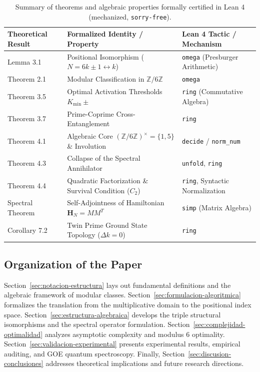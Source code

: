 \documentclass{article}
\numberwithin{equation}{section}
\theoremstyle{plain}
\theoremstyle{definition}
\begin{document}

\begin{table}[htbp]
\centering
\small
\caption{Summary of theorems and algebraic properties formally certified in Lean 4 (mechanized, \texttt{sorry-free}).}
\label{tab:lean4-certifications}
\begin{tabular}{lll}
\toprule
\textbf{Theoretical Result} & \textbf{Formalized Identity / Property} & \textbf{Lean 4 Tactic / Mechanism} \\
\midrule
Lemma 3.1 & Positional Isomorphism ($N = 6k \pm 1 \leftrightarrow k$) & \texttt{omega} (Presburger Arithmetic) \\
Theorem 2.1 & Modular Classification in $\mathbb{Z}/6\mathbb{Z}$ & \texttt{omega} \\
Theorem 3.5 & Optimal Activation Thresholds $K_{\min}\pm$ & \texttt{ring} (Commutative Algebra) \\
Theorem 3.7 & Prime-Coprime Cross-Entanglement & \texttt{ring} \\
Theorem 4.1 & Algebraic Core $(\mathbb{Z}/6\mathbb{Z})^\times = \{1, 5\}$ \& Involution & \texttt{decide} / \texttt{norm\_num} \\
Theorem 4.3 & Collapse of the Spectral Annihilator & \texttt{unfold}, \texttt{ring} \\
Theorem 4.4 & Quadratic Factorization \& Survival Condition ($C_2$) & \texttt{ring}, Syntactic Normalization \\
Spectral Theorem & Self-Adjointness of Hamiltonian $\mathbf{H}_N = MM^T$ & \texttt{simp} (Matrix Algebra) \\
Corollary 7.2 & Twin Prime Ground State Topology ($\Delta k = 0$) & \texttt{ring} \\
\bottomrule
\end{tabular}
\end{table}

\subsection*{Organization of the Paper}

Section~\ref{sec:notacion-estructura} lays out fundamental definitions and the algebraic framework of modular classes. Section~\ref{sec:formulacion-algoritmica} formalizes the translation from the multiplicative domain to the positional index space. Section~\ref{sec:estructura-algebraica} develops the triple structural isomorphisms and the spectral operator formulation. Section~\ref{sec:complejidad-optimalidad} analyzes asymptotic complexity and modulus 6 optimality. Section~\ref{sec:validacion-experimental} presents experimental results, empirical auditing, and GOE quantum spectroscopy. Finally, Section~\ref{sec:discusion-conclusiones} addresses theoretical implications and future research directions.
\end{document}
